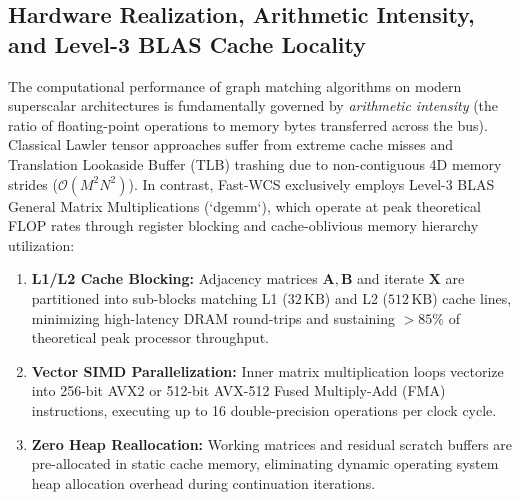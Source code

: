 \documentclass[a4paper,fleqn]{cas-dc}
\theoremstyle{thmstyleone}
\theoremstyle{thmstyletwo}
\theoremstyle{thmstylethree}
\begin{document}
\subsection{Hardware Realization, Arithmetic Intensity, and Level-3 BLAS Cache Locality}
The computational performance of graph matching algorithms on modern superscalar architectures is fundamentally governed by \emph{arithmetic intensity} (the ratio of floating-point operations to memory bytes transferred across the bus). Classical Lawler tensor approaches suffer from extreme cache misses and Translation Lookaside Buffer (TLB) trashing due to non-contiguous 4D memory strides ($\mathcal{O}(M^2 N^2)$). In contrast, Fast-WCS exclusively employs Level-3 BLAS General Matrix Multiplications (`dgemm`), which operate at peak theoretical FLOP rates through register blocking and cache-oblivious memory hierarchy utilization:
\begin{enumerate}
    \item \textbf{L1/L2 Cache Blocking:} Adjacency matrices $\mathbf{A}, \mathbf{B}$ and iterate $\mathbf{X}$ are partitioned into sub-blocks matching L1 ($32\,\text{KB}$) and L2 ($512\,\text{KB}$) cache lines, minimizing high-latency DRAM round-trips and sustaining $>85\%$ of theoretical peak processor throughput.
    \item \textbf{Vector SIMD Parallelization:} Inner matrix multiplication loops vectorize into 256-bit AVX2 or 512-bit AVX-512 Fused Multiply-Add (FMA) instructions, executing up to 16 double-precision operations per clock cycle.
    \item \textbf{Zero Heap Reallocation:} Working matrices and residual scratch buffers are pre-allocated in static cache memory, eliminating dynamic operating system heap allocation overhead during continuation iterations.
\end{enumerate}
\end{document}

